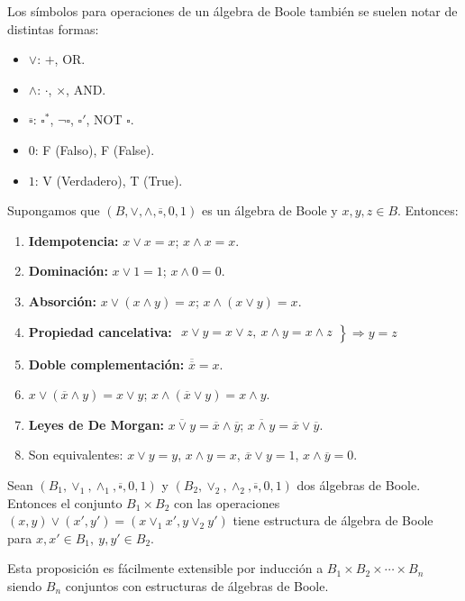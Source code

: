 \begin{obs}
    Los símbolos para operaciones de un álgebra de Boole también se suelen notar de distintas formas:
    \begin{itemize}
        \item $\lor$: $+$, OR.
        \item $\land$: $\cdot$, $\times$, AND.
        \item $\overline{\square}$: $\square^*$, $\neg \square$, $\square'$, NOT $\square$.
        \item $0$: F (Falso), F (False).
        \item $1$: V (Verdadero), T (True).
    \end{itemize}
\end{obs}

\begin{properties}
    Supongamos que $(B, \lor, \land, \overline{\square}, 0, 1)$ es un álgebra de Boole y $x,y,z \in B$. Entonces:
    \begin{enumerate}
        \item \textbf{Idempotencia: } $x \lor x = x$; $x \land x = x$.
        \item \textbf{Dominación: } $x \lor 1 = 1$; $x \land 0 = 0$.
        \item \textbf{Absorción: } $x \lor (x \land y) = x$; $x \land (x \lor y) = x$.
        \item \textbf{Propiedad cancelativa: }
              $\left.
                  \begin{aligned}
                      x \lor y = x \lor z, \
                      x \land y = x \land z
                  \end{aligned}
                  \right \} \Rightarrow y = z$
        \item \textbf{Doble complementación: } $\overline{\overline{x}}=x $.
        \item $x \lor (\overline{x}  \land y) = x \lor y$; $x \land (\overline{x} \lor y) = x \land y$.
        \item \textbf{Leyes de De Morgan: } $\overline{x \lor y} = \overline{x} \land \overline{y}$; $\overline{x \land y} = \overline{x} \lor \overline{y}$.
        \item Son equivalentes: $x \lor y = y$, $x \land y = x$, $\overline{x} \lor y = 1$, $x \land \overline{y} = 0$.
    \end{enumerate}
\end{properties}

\begin{nprop}
    Sean $(B_1, \lor_1, \land_1, \overline{\square}, 0, 1)$ y $(B_2, \lor_2, \land_2, \overline{\square}, 0, 1)$ dos álgebras de Boole. Entonces el conjunto $B_1 \times B_2$ con las operaciones
    $(x,y) \lor (x',y') = (x \lor_1 x', y \lor_2 y')$ tiene estructura de álgebra de Boole para $x,x' \in B_1, \ y,y' \in B_2$.
\end{nprop}
\begin{nota}
    Esta proposición es fácilmente extensible por inducción a $B_1 \times B_2 \times \cdots \times B_n$ siendo $B_n$ conjuntos con estructuras de álgebras de Boole.
\end{nota}

